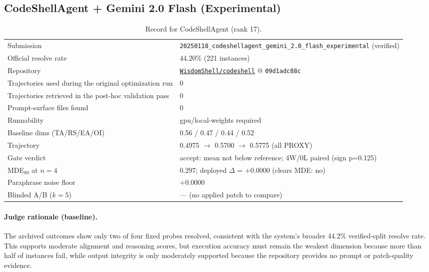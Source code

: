 \subsection{CodeShellAgent + Gemini 2.0 Flash (Experimental)}
\label{app:agent17}
\begin{table}[H]\centering\scriptsize
\caption{Record for CodeShellAgent (rank 17).}
\begin{tabular}{lp{8.2cm}}\toprule
Submission & \texttt{20250118\_\allowbreak{}codeshellagent\_\allowbreak{}gemini\_\allowbreak{}2.0\_\allowbreak{}flash\_\allowbreak{}experimental} (verified) \\
Official resolve rate & 44.20\% (221 instances) \\
Repository & \href{https://github.com/WisdomShell/codeshell}{\texttt{WisdomShell/codeshell}} @ \texttt{09d1adc88c} \\
Trajectories used during the original optimization run & 0 \\
Trajectories retrieved in the post-hoc validation pass & 0 \\
Prompt-surface files found & 0 \\
Runnability & gpu/local-weights required \\
Baseline dims (TA/RS/EA/OI) & 0.56 / 0.47 / 0.44 / 0.52 \\
Trajectory & 0.4975 $\to$ 0.5700 $\to$ 0.5775 (all PROXY) \\
Gate verdict & accept: mean not below reference; 4W/0L paired (sign p=0.125) \\
MDE$_{80}$ at $n{=}4$ & 0.297; deployed $\Delta$ = +0.0000 (clears MDE: no) \\
Paraphrase noise floor & +0.0000 \\
Blinded A/B ($k{=}5$) & --- (no applied patch to compare) \\
\bottomrule\end{tabular}\end{table}
\paragraph{Judge rationale (baseline).}
The archived outcomes show only two of four fixed probes resolved, consistent with the system's broader 44.2\% verified-split resolve rate. This supports moderate alignment and reasoning scores, but execution accuracy must remain the weakest dimension because more than half of instances fail, while output integrity is only moderately supported because the repository provides no prompt or patch-quality evidence.
